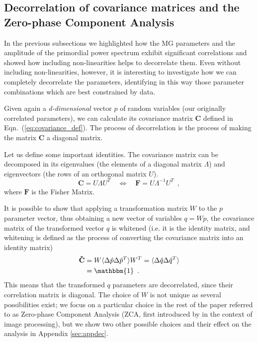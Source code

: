 \subsection{\label{sub:Decorrelation-of-covariance}Decorrelation of covariance
matrices and the Zero-phase Component Analysis}

In the previous subsections we highlighted how the MG parameters and the 
amplitude of the primordial power spectrum exhibit significant correlations and showed how including non-linearities helps to decorrelate them. Even without including non-linearities, however, it is interesting to investigate how we can completely decorrelate the parameters, identifying in this way those parameter combinations which are best constrained by data.

Given again a \emph{d-dimensional} vector
$p$ of random variables (our originally correlated parameters), we can calculate its covariance matrix $\mathbf C$ defined in Eqn.\ (\ref{eq:covariance_def}). The process of decorrelation is the process of making the matrix $\mathbf C$ 
a diagonal matrix.

Let us define some important identities. The covariance
matrix can be decomposed in its eigenvalues (the elements of a diagonal matrix $\Lambda$) and eigenvectors
(the rows of an orthogonal matrix $U$).
\begin{equation}
\mathbf C=U\Lambda U^{T} \quad \Leftrightarrow \quad 
\mathbf F=U\Lambda^{-1}U^{T} \,\,\, ,
\label{eq:eigensystemofC}
\end{equation}
where $\mathbf F$ is the Fisher Matrix.

It is possible to show that applying a transformation matrix $W$ to the $p$ parameter vector, thus obtaining a new vector of variables $q=Wp$, the covariance matrix of the transformed vector $q$ is whitened (i.e. it is the identity matrix, and whitening is defined as the process
of converting the covariance matrix into an identity matrix)
\begin{align}
\mathbf {\tilde{C}} & =W\langle\Delta\hat{p}\Delta\hat{p}^{T}\rangle W^{T} =\langle\Delta\hat{q}\Delta\hat{q}^{T}\rangle \label{eq:Cwhitened}\\
 & = \mathbbm{1} \,\,\, . \nonumber
\end{align} 
This means that the transformed $q$ parameters are decorrelated, since their correlation matrix is diagonal. The choice of $W$ 
is not unique as several  possibilities
exist; we focus on a particular choice in the rest of the paper referred to as Zero-phase Component Analysis (ZCA, first 
introduced by \cite{Bell19973327} in the context of image processing), but we show
two other possible choices and their effect on the analysis in Appendix
\ref{sec:appdec}.

